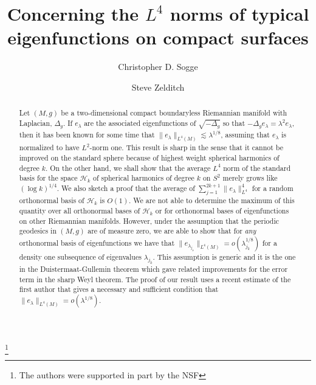 \documentclass[10pt]{amsart}
\begin{document}

\title[$L^4$ norms of typical eigenfunctions]
{Concerning the $L^4$ norms of typical eigenfunctions on compact surfaces}
\thanks{The authors were supported in part by the NSF}

\author{Christopher D. Sogge}
\author{Steve Zelditch}
\address{Johns Hopkins University, Baltimore, MD}
\address{Northwestern University, Evanston, IL}

\maketitle

\begin{abstract}
Let $(M,g)$ be a two-dimensional compact
boundaryless Riemannian manifold with Laplacian, $\Delta_g$.  If
$e_\lambda$ are the associated eigenfunctions of
$\sqrt{-\Delta_g}$ so that $-\Delta_g e_\lambda = \lambda^2
e_\lambda$, then it has been known for some time \cite{soggeest}
that $\|e_\lambda\|_{L^4(M)}\lesssim \lambda^{1/8}$, assuming that
$e_\lambda$ is normalized to have $L^2$-norm one.  This result is
sharp in the sense that it cannot be improved on the standard
sphere because of highest weight spherical harmonics of degree
$k$. On the other hand, we shall show that the average $L^4$ norm
of the standard basis for the space ${\mathcal H}_k$ of  spherical
harmonics of degree $k$ on $S^2$ merely grows like $(\log
k)^{1/4}$.  We also sketch a proof that the average of  $\sum_{j =
1}^{2k + 1} \|e_\lambda\|_{L^4}^4$ for a random orthonormal basis
of ${\mathcal H}_k$ is $O(1)$.
 We
are not able to determine the maximum of this quantity over all
orthonormal bases of ${\mathcal H}_k$  or for orthonormal bases of
eigenfunctions on  other Riemannian  manifolds. However, under the
assumption that the periodic geodesics in $(M,g)$ are of measure
zero, we are able to show that for {\it any} orthonormal basis of
eigenfunctions we have that
$\|e_{\lambda_{j_k}}\|_{L^4(M)}=o(\lambda_{j_k}^{1/8})$ for a
density one subsequence of eigenvalues $\lambda_{j_k}$.  This
assumption is generic and it is the one in the
Duistermaat-Gullemin theorem \cite{dg} which gave related
improvements for the error term in the sharp Weyl theorem. The
proof of our result uses a recent estimate of the first author
\cite{Sokakeya}
 that
gives a necessary and sufficient condition that
$\|e_\lambda\|_{L^4(M)}=o(\lambda^{1/8})$.
\end{abstract}
\end{document}
